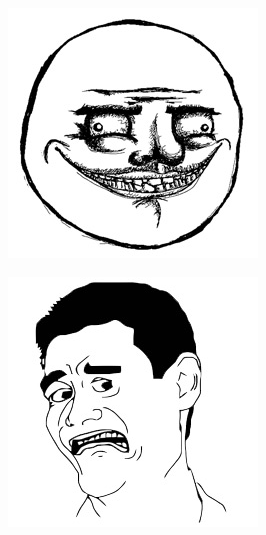 \begin{multicols}{8}
\begin{center}
\includegraphics[width=\linewidth]{./IMG-GIT/MEMES/Meme-Faces-14.jpg}  
\end{center}

\begin{center}
\includegraphics[width=\linewidth]{./IMG-GIT/MEMES/Meme-Faces-24.jpg}  
\end{center}


\end{multicols}
